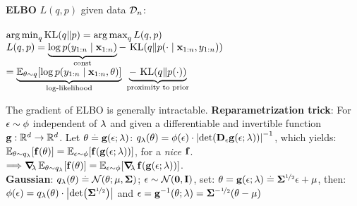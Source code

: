 \vspace{1mm}
\begin{framed}
    \textbf{ELBO} $L(q,p)$ given data $\mathcal{D}_n$:\\ \\
        $\argmin_q \KL{q}{p}=\argmax_q L(q,p)$ \\
        $L(q, p) = \underbrace{\log p(y_{1:n} \mid \vx_{1:n})}_{\const} -\ \KL{q}{p(\cdot \mid \vx_{1:n}, y_{1:n})}$ \\
        $= \underbrace{\E[\vtheta \sim q]{\log p(y_{1:n} \mid \vx_{1:n}, \vtheta)}}_{\text{log-likelihood}}\ \underbrace{-\ \KL{q}{p(\cdot)}}_{\text{proximity to prior}}$
\end{framed}
The gradient of ELBO is generally intractable. \textbf{Reparametrization trick}: For $\mathbf{\epsilon} \sim \phi$ independent of $\mathbf{\lambda}$ and given a differentiable and invertible function $\mathbf{g} : \mathbb{R}^d \to \mathbb{R}^d$. Let $\mathbf{\theta} \overset{.}{=} \mathbf{g}(\mathbf{\epsilon}; \mathbf{\lambda})$: $q_\vlambda(\vtheta) = \phi(\vepsilon) \cdot \inv{\abs{\det{\jac_\vepsilon \vg(\vepsilon; \vlambda)}}}$, which yields: $\E[\vtheta \sim q_\vlambda]{\vf(\vtheta)} = \E[\vepsilon \sim \phi]{\vf(\vg(\vepsilon; \vlambda))}$, for a \textit{nice} $\mathbf{f}$. \\
$\Longrightarrow\grad_\vlambda \E[\vtheta \sim q_\vlambda]{\vf(\vtheta)} = \E[\vepsilon \sim \phi]{\grad_\vlambda \vf(\vg(\vepsilon; \vlambda))}$. \\
\textbf{Gaussian}: $q_\vlambda(\vtheta) \defeq \N[\vtheta]{\vmu}{\mSigma}$; ${\vepsilon \sim \SN}$, set: $\mathbf{\theta} = \mathbf{g}(\mathbf{\epsilon}; \mathbf{\lambda}) \overset{.}{=} \mathbf{\Sigma}^{\nicefrac{1}{2}} \mathbf{\epsilon} + \mathbf{\mu}$, then: $\phi(\vepsilon) = q_\vlambda(\vtheta) \cdot \abs{\det{\msqrt{\mSigma}}}$ and $\mathbf{\epsilon} = \mathbf{g}^{-1}(\mathbf{\theta}; \mathbf{\lambda}) = \mathbf{\Sigma}^{-\nicefrac{1}{2}}(\mathbf{\theta} - \mathbf{\mu})$ \\

